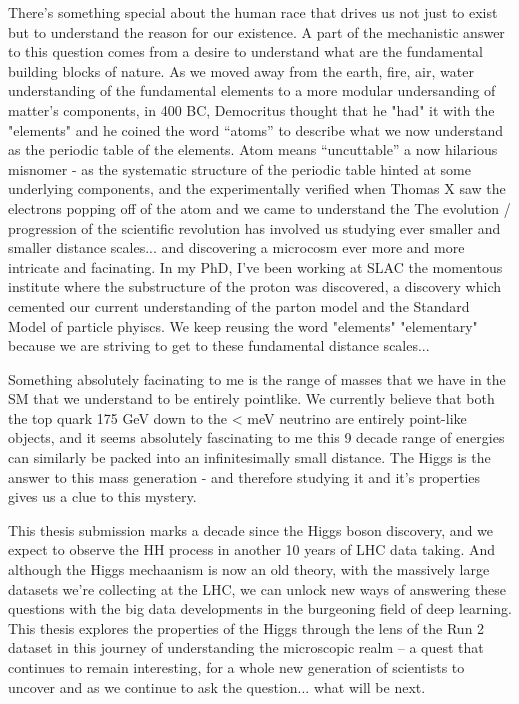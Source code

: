 
There's something special about the human race that drives us not just to exist but to understand the reason for our existence.
A part of the mechanistic answer to this question comes from a desire to understand what are the fundamental building blocks of nature. 
As we moved away from the earth, fire, air, water understanding of the fundamental elements to a more modular undersanding of matter's components, in 400 BC, Democritus thought that he "had" it with the "elements" and he coined the word ``atoms'' to describe what we now understand as the periodic table of the elements.
Atom means ``uncuttable'' a now hilarious misnomer - as the systematic structure of the periodic table hinted at some underlying components, and the experimentally verified when Thomas X saw the electrons popping off of the atom and we came to understand the 
The evolution / progression of the scientific revolution has involved us studying ever smaller and smaller distance scales... and discovering a microcosm ever more and more intricate and facinating.
In my PhD, I've been working at SLAC the momentous institute where the substructure of the proton was discovered, a discovery which cemented our current understanding of the parton model and the Standard Model of particle phyiscs.
We keep reusing the word "elements" "elementary" because we are striving to get to these fundamental distance scales... 

Something absolutely facinating to me is the range of masses that we have in the SM that we understand to be entirely pointlike.
We currently believe that both the top quark 175 GeV  down to the < meV neutrino are entirely point-like objects, and it seems absolutely fascinating to me this 9 decade range of energies can similarly be packed into an infinitesimally small distance.
The Higgs is the answer to this mass generation - and therefore studying it and it's properties gives us a clue to this mystery.

This thesis submission marks a decade since the Higgs boson discovery, and we expect to observe the HH process in another 10 years of LHC data taking.
And although the Higgs mechaanism is now an old theory, with the massively large datasets we're collecting at the LHC, we can unlock new ways of answering these questions with the big data developments in the burgeoning field of deep learning.
This thesis explores the properties of the Higgs through the lens of the Run 2 dataset in this journey of understanding the microscopic realm -- a quest that continues to remain interesting, for a whole new generation of scientists to uncover and as we continue to ask the question... what will be next.